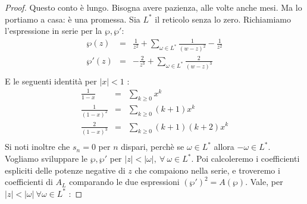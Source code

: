 \begin{proof}
Questo conto è lungo. Bisogna avere pazienza, alle volte anche mesi. Ma lo portiamo a casa: è una promessa. \newline
Sia $L^*$ il reticolo senza lo zero. Richiamiamo l'espressione in serie per la $\wp, \wp'$:
\begin{eqnarray*}
\wp(z) & = & \frac{1}{z^2} + \sum_{\omega \in L^*} \frac{1}{(w-z)^2} -\frac{1}{z^2} \\
\wp'(z) & = & -\frac{2}{z^3} + \sum_{\omega \in L^*} \frac{2}{(w-z)^3} \\
\end{eqnarray*}
E le seguenti identità per $|x| < 1$ :
\begin{eqnarray*}
\frac{1}{1-x} & = & \sum_{k \ge 0} x^k \\
\frac{1}{(1-x)^2} & = & \sum_{k \ge 0} (k+1)x^k \\
\frac{2}{(1-x)^3} & = & \sum_{k \ge 0} (k+1)(k+2) x^k \\
\end{eqnarray*}
Si noti inoltre che $s_n=0$ per $n$ dispari, perchè se $\omega \in L^*$ allora $-\omega \in L^*$. Vogliamo sviluppare le $\wp, \wp'$ per $|z| < |\omega|, \ \forall \ \omega \in L^*$. Poi calcoleremo i coefficienti espliciti delle potenze negative di $z$ che compaiono nella serie, e troveremo i coefficienti di $A_L$ comparando le due espressioni $(\wp')^2 = A(\wp)$. Vale, per $|z| < |\omega| \ \forall \omega \in L^*$ :


\end{proof}
